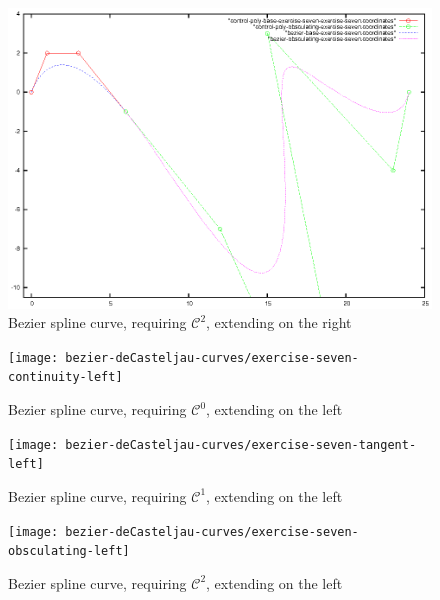\documentclass{article}
\begin{document}
\begin{figure}[h!]
  \centering
  \includegraphics{bezier-deCasteljau-curves/exercise-seven-obsculating}
  \caption{Bezier spline curve, requiring $\mathcal{C}^2$, extending on the right}
  \label{fig:bezier-spline-right-extension-obsculating}
\end{figure}


\begin{figure}[h!]
  \centering
  \texttt{[image: bezier-deCasteljau-curves/exercise-seven-continuity-left]}
  \caption{Bezier spline curve, requiring $\mathcal{C}^0$, extending on the left}
  \label{fig:bezier-spline-left-extension-continuity}
\end{figure}

\begin{figure}[h!]
  \centering
  \texttt{[image: bezier-deCasteljau-curves/exercise-seven-tangent-left]}
  \caption{Bezier spline curve, requiring $\mathcal{C}^1$, extending on the left}
  \label{fig:bezier-spline-left-extension-tangent}
\end{figure}

\begin{figure}[h!]
  \centering
  \texttt{[image: bezier-deCasteljau-curves/exercise-seven-obsculating-left]}
  \caption{Bezier spline curve, requiring $\mathcal{C}^2$, extending on the left}
  \label{fig:bezier-spline-left-extension-obsculating}
\end{figure}

\end{document}
